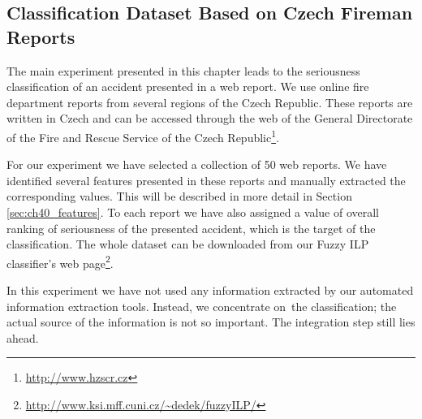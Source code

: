 \subsection{Classification Dataset Based on Czech Fireman Reports} \label{sec:ch40_classify_fireman}


The main experiment presented in this chapter leads to the seriousness classification of an accident presented in a web report. %
We use online fire department reports from several regions of the Czech Republic. These reports are written in Czech and can be accessed through the web of the General Directorate of the Fire and Rescue Service of the Czech Republic\footnote{\url{http://www.hzscr.cz}}. 

For our experiment we have selected a collection of 50 web reports. We have identified several features presented in these reports and manually extracted the corresponding values. This will be described in more detail in Section \ref{sec:ch40_features}. To each report we have also assigned a value of overall ranking of seriousness of the presented accident, which is the target of the classification. The whole dataset can be downloaded from our Fuzzy ILP classifier's web page\footnote{\url{http://www.ksi.mff.cuni.cz/~dedek/fuzzyILP/}}.

In this experiment we have not used any information extracted by our automated information extraction tools. Instead, we concentrate on~the classification; the actual source of the information is not so important. The integration step still lies ahead.





